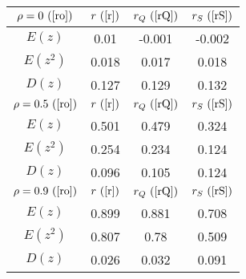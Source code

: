 \begin{tabular}{|c|c|c|c|}
\hline
$\rho = 0~(\ref{ro})$ & $r ~(\ref{r})$ & $r_Q ~(\ref{rQ})$ & $r_S ~(\ref{rS})$\\
\hline
$E(z)$ & 0.01 & -0.001 & -0.002\\
\hline
$E(z^2)$ & 0.018 & 0.017 & 0.018\\
\hline
$D(z)$ & 0.127 & 0.129 & 0.132\\
\hline
$\rho = 0.5~(\ref{ro})$ & $r ~(\ref{r})$ & $r_Q ~(\ref{rQ})$ & $r_S ~(\ref{rS})$\\
\hline
$E(z)$ & 0.501 & 0.479 & 0.324\\
\hline
$E(z^2)$ & 0.254 & 0.234 & 0.124\\
\hline
$D(z)$ & 0.096 & 0.105 & 0.124\\
\hline
$\rho = 0.9~(\ref{ro})$ & $r ~(\ref{r})$ & $r_Q ~(\ref{rQ})$ & $r_S ~(\ref{rS})$\\
\hline
$E(z)$ & 0.899 & 0.881 & 0.708\\
\hline
$E(z^2)$ & 0.807 & 0.78 & 0.509\\
\hline
$D(z)$ & 0.026 & 0.032 & 0.091\\
\hline
\end{tabular}